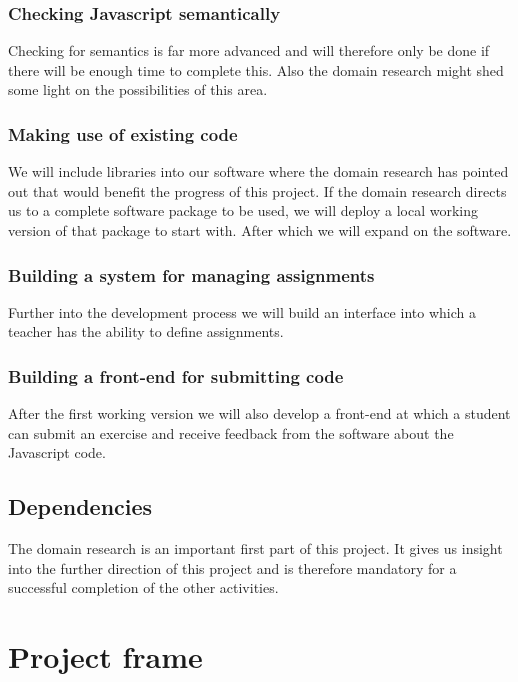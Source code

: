 \documentclass{article}
\begin{document}
\subsubsection{Checking Javascript semantically}
Checking for semantics is far more advanced and will therefore only be done if there will be enough time to complete this. Also the domain research might shed some light on the possibilities of this area.
\subsubsection{Making use of existing code}
We will include libraries into our software where the domain research has pointed out that would benefit the progress of this project. If the domain research directs us to a complete software package to be used, we will deploy a local working version of that package to start with. After which we will expand on the software.
\subsubsection{Building a system for managing assignments}
Further into the development process we will build an interface into which a teacher has the ability to define assignments.
\subsubsection{Building a front-end for submitting code}
After the first working version we will also develop a front-end at which a student can submit an exercise and receive feedback from the software about the Javascript code.
\subsection{Dependencies}
The domain research is an important first part of this project. It gives us insight into the further direction of this project and is therefore mandatory for a successful completion of the other activities.

\section{Project frame}
\end{document}
